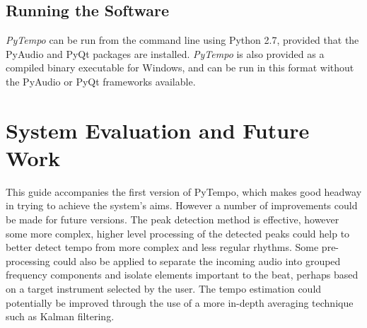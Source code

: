 \documentclass[hidelinks,12pt]{article}
\begin{document}
\subsection{Running the Software}
\textit{PyTempo} can be run from the command line using Python 2.7, provided that the PyAudio and PyQt packages are installed. \textit{PyTempo} is also provided as a compiled binary executable for Windows, and can be run in this format without the PyAudio or PyQt frameworks available.

\section{System Evaluation and Future Work}
This guide accompanies the first version of PyTempo, which makes good headway in trying to achieve the system's aims. However a number of improvements could be made for future versions. The peak detection method is effective, however some more complex, higher level processing of the detected peaks could help to better detect tempo from more complex and less regular rhythms. Some pre-processing could also be applied to separate the incoming audio into grouped frequency components and isolate elements important to the beat, perhaps based on a target instrument selected by the user. The tempo estimation could potentially be improved through the use of a more in-depth averaging technique such as Kalman filtering.
\end{document}
